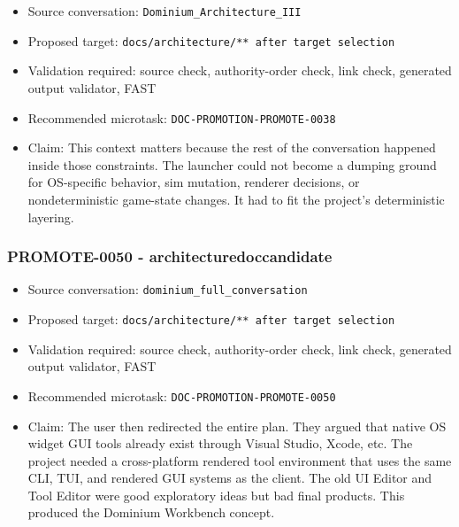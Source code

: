 \documentclass[9pt,a4paper,openany]{book}
\begin{document}
\begin{itemize}
\item Source conversation: \texttt{Dominium\_\allowbreak{}Architecture\_\allowbreak{}III}
\item Proposed target: \texttt{docs/\allowbreak{}architecture/\allowbreak{}** after target selection}
\item Validation required: source check, authority-\allowbreak{}order check, link check, generated output validator, FAST
\item Recommended microtask: \texttt{DOC-\allowbreak{}PROMOTION-\allowbreak{}PROMOTE-\allowbreak{}0038}
\item Claim: This context matters because the rest of the conversation happened inside those constraints.\allowbreak{} The launcher could not become a dumping ground for OS-\allowbreak{}specific behavior, sim mutation, renderer decisions, or nondeterministic game-\allowbreak{}state changes.\allowbreak{} It had to fit the project's deterministic layering.\allowbreak{}
\end{itemize}

\subsubsection{PROMOTE-0050 - architecturedoccandidate}

\begin{itemize}
\item Source conversation: \texttt{dominium\_\allowbreak{}full\_\allowbreak{}conversation}
\item Proposed target: \texttt{docs/\allowbreak{}architecture/\allowbreak{}** after target selection}
\item Validation required: source check, authority-\allowbreak{}order check, link check, generated output validator, FAST
\item Recommended microtask: \texttt{DOC-\allowbreak{}PROMOTION-\allowbreak{}PROMOTE-\allowbreak{}0050}
\item Claim: The user then redirected the entire plan.\allowbreak{} They argued that native OS widget GUI tools already exist through Visual Studio, Xcode, etc.\allowbreak{} The project needed a cross-\allowbreak{}platform rendered tool environment that uses the same CLI, TUI, and rendered GUI systems as the client.\allowbreak{} The old UI Editor and Tool Editor were good exploratory ideas but bad final products.\allowbreak{} This produced the Dominium Workbench concept.\allowbreak{}
\end{itemize}
\end{document}
